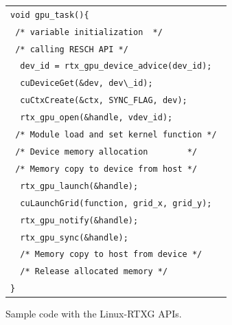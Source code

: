 \begin{figure}[!t]
\begin{center}
\begin{tabular}{l}
\hline\hline
{\scriptsize \verb|void gpu_task(){        |}\\
{\scriptsize \verb| /* variable initialization  */        |}\\
{\scriptsize \verb| /* calling RESCH API */        |}\\
{\scriptsize \verb|  dev_id = rtx_gpu_device_advice(dev_id); |}\\
{\scriptsize \verb|  cuDeviceGet(&dev, dev\_id);           |}\\
{\scriptsize \verb|  cuCtxCreate(&ctx, SYNC_FLAG, dev);    |}\\
{\scriptsize \verb|  rtx_gpu_open(&handle, vdev_id);     |}\\
{\scriptsize \verb| /* Module load and set kernel function */ |}\\
{\scriptsize \verb| /* Device memory allocation        */ |}\\
{\scriptsize \verb| /* Memory copy to device from host */ |}\\
{\scriptsize \verb|  rtx_gpu_launch(&handle); |}\\
{\scriptsize \verb|  cuLaunchGrid(function, grid_x, grid_y); |}\\
{\scriptsize \verb|  rtx_gpu_notify(&handle); |}\\
{\scriptsize \verb|  rtx_gpu_sync(&handle);   |}\\
{\scriptsize \verb|  /* Memory copy to host from device */  |}\\
{\scriptsize \verb|  /* Release allocated memory */  |}\\
{\scriptsize \verb|}|}\\
\hline\hline
\end{tabular}
\caption{Sample code with the Linux-RTXG APIs.}
\label{fig:sample}
\end{center}
\end{figure}

